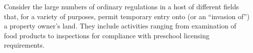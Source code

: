 Consider the large numbers of ordinary regulations in a host of different fields
that, for a variety of purposes, permit temporary entry onto (or an ``invasion
of'') a property owner's land. They include activities ranging from examination
of food products to inspections for compliance with preschool licensing
requirements.


